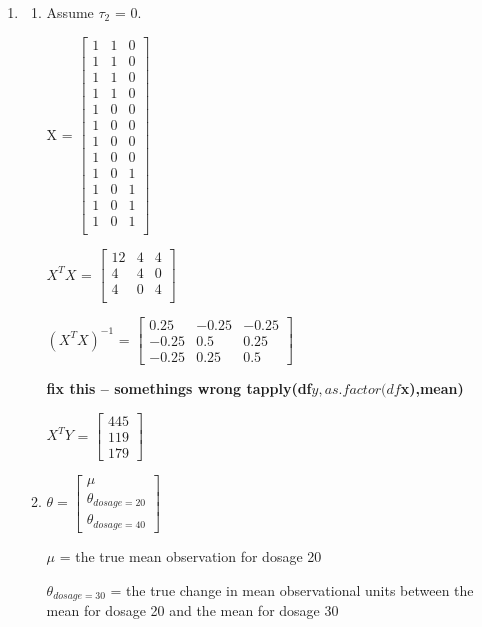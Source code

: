 \documentclass{article}\usepackage[]{graphicx}\usepackage[]{color}
\begin{document}
\begin{enumerate}
\item %

\begin{enumerate}
\item %
Assume $\tau_{2}$ = 0.



X = $\begin{bmatrix}
 1 & 1 & 0\\
 1 & 1 & 0\\
 1 & 1 & 0\\
 1 & 1 & 0\\
 1 & 0 & 0\\
 1 & 0 & 0\\
 1 & 0 & 0\\
 1 & 0 & 0\\
 1 & 0 & 1\\
 1 & 0 & 1\\
 1 & 0 & 1\\
 1 & 0 & 1\\
 \end{bmatrix}$
 
 $X^{T}X$ = $\begin{bmatrix}
 12 & 4 & 4\\
 4 & 4 & 0\\
 4 & 0 & 4\\
 \end{bmatrix}$
 
 $(X^{T}X)^{-1}$ = $\begin{bmatrix}
 0.25 & -0.25 & -0.25\\
 -0.25 & 0.5 & 0.25\\
 -0.25 & 0.25 & 0.5
 \end{bmatrix}$
 
 {\bf fix this -- somethings wrong tapply(df$y,as.factor(df$x),mean)}
 
 $X^{T}Y$ = $\begin{bmatrix}
 445\\
 119\\
 179
 \end{bmatrix}$
 

\item %

$\theta = \begin{bmatrix}
\mu \\
\theta_{dosage=20}\\
\theta_{dosage=40}
\end{bmatrix}$

$\mu$ = the true mean observation for dosage 20

$\theta_{dosage = 30}$ = the true change in mean observational units between the mean for dosage 20 and the mean for dosage 30


\end{enumerate}
\end{enumerate}
\end{document}
